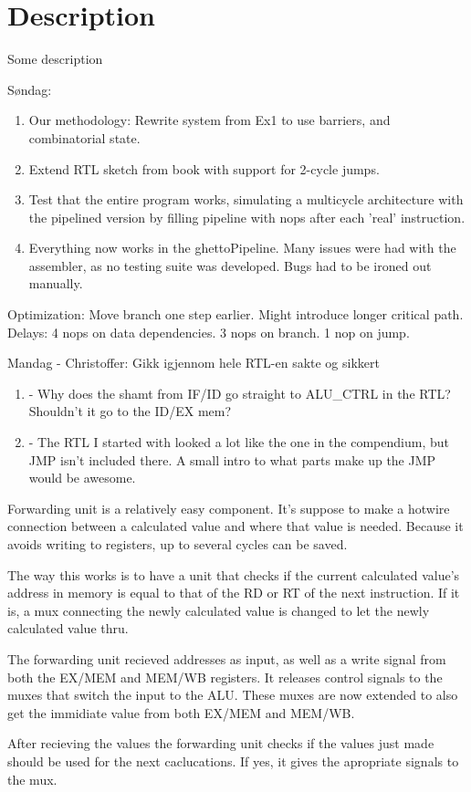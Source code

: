 \section{Description}

Some description

Søndag:

\begin{enumerate}
  \item Our methodology: Rewrite system from Ex1 to use barriers, and combinatorial state.
  \item Extend RTL sketch from book with support for 2-cycle jumps.
  \item Test that the entire program works, simulating a multicycle architecture with the pipelined version by filling pipeline with nops after each 'real' instruction.
  \item Everything now works in the ghettoPipeline. Many issues were had with the assembler, as no testing suite was developed. Bugs had to be ironed out manually.
\end{enumerate}

Optimization: Move branch one step earlier. Might introduce longer critical path.
Delays: 4 nops on data dependencies. 3 nops on branch. 1 nop on jump.


Mandag - Christoffer:
Gikk igjennom hele RTL-en sakte og sikkert
\begin{enumerate}
    \item - Why does the shamt from IF/ID go straight to ALU\_CTRL in the RTL? Shouldn't it go to the ID/EX mem?
    \item - The RTL I started with looked a lot like the one in the compendium, but JMP isn't included there.
    A small intro to what parts make up the JMP would be awesome.
\end{enumerate}

Forwarding unit is a relatively easy component.
It's suppose to make a hotwire connection between a calculated value and where that value is needed.
Because it avoids writing to registers, up to several cycles can be saved.

The way this works is to have a unit that checks if the current calculated value's address in memory
is equal to that of the RD or RT of the next instruction.
If it is, a mux connecting the newly calculated value is changed to let the newly calculated value thru.

The forwarding unit recieved addresses as input, as well as a write signal from both
the EX/MEM and MEM/WB registers.
It releases control signals to the muxes that switch the input to the ALU.
These muxes are now extended to also get the immidiate value from both EX/MEM and MEM/WB.

After recieving the values the forwarding unit checks if the values just made should be used for the next
caclucations.
If yes, it gives the apropriate signals to the mux.
